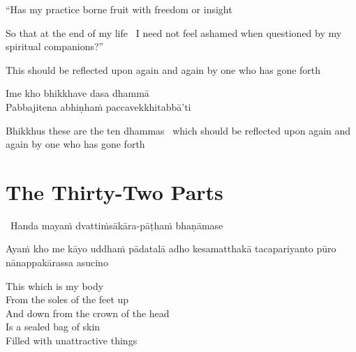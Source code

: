 \begin{english-verses}
  ``Has my practice borne fruit with freedom or insight\\
  \begin{english-hangtogether-verses}
    So that at the end of my life \breathmark\ I need not feel ashamed when questioned by my spiritual companions?''
  \end{english-hangtogether-verses}
  \begin{english-hangtogether-verses}
    This should be reflected upon again and again by one who has gone forth
  \end{english-hangtogether-verses}
\end{english-verses}

Ime kho bhikkhave dasa dhammā\\
Pabbajitena abhiṇhaṁ paccavekkhitabbā'ti

\begin{english-hang-verses}
  Bhikkhus these are the ten dhammas \breathmark\ which should be reflected upon again and again by one who has gone forth
\end{english-hang-verses}

\suttaRef{[AN 10.48]}


\section{The Thirty-Two Parts}
\label{32-parts}

\begin{leader}
  \anglebracketleft\ \hspace{-0.5mm}Handa mayaṁ dvattiṁsākāra-pāṭhaṁ bhaṇāmase \hspace{-0.5mm}\anglebracketright\
\end{leader}

\begin{pali-hang}
  Ayaṁ kho me kāyo uddhaṁ pādatalā adho kesamatthakā tacapariyanto pūro nānappakārassa asucino
\end{pali-hang}

\begin{english-verses}
  This which is my body\\
  From the soles of the feet up\\
  And down from the crown of the head\\
  Is a sealed bag of skin\\
  Filled with unattractive things
\end{english-verses}

